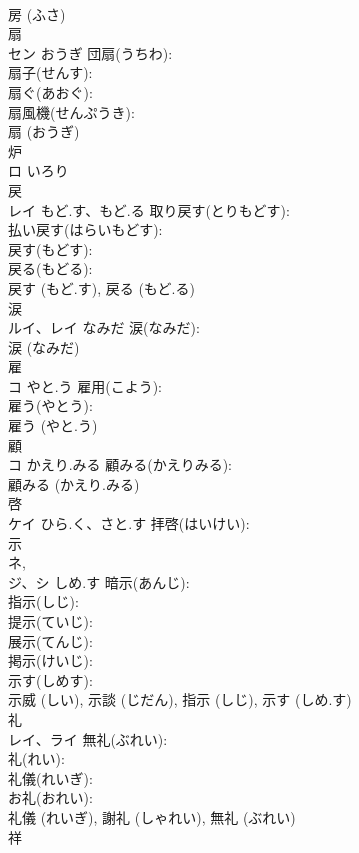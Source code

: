 \documentclass[8pt]{extreport}
\begin{document}
\begin{CJK}{UTF8}{min}
\\	房 (ふさ)
\\	扇			
\\	セン	おうぎ	団扇(うちわ): 
\\	扇子(せんす): 
\\	扇ぐ(あおぐ): 
\\	扇風機(せんぷうき): 
\\	扇 (おうぎ)
\\	炉			
\\	ロ	いろり		
\\	戻			
\\	レイ	もど.す、もど.る	取り戻す(とりもどす): 
\\	払い戻す(はらいもどす): 
\\	戻す(もどす): 
\\	戻る(もどる): 
\\	戻す (もど.す), 戻る (もど.る)
\\	涙			
\\	ルイ、レイ	なみだ	涙(なみだ): 
\\	涙 (なみだ)
\\	雇			
\\	コ	やと.う	雇用(こよう): 
\\	雇う(やとう): 
\\	雇う (やと.う)
\\	顧			
\\	コ	かえり.みる	顧みる(かえりみる): 
\\	顧みる (かえり.みる)
\\	啓			
\\	ケイ	ひら.く、さと.す	拝啓(はいけい): 
\\	示			
\\	ネ, 
\\	ジ、シ	しめ.す	暗示(あんじ): 
\\	指示(しじ): 
\\	提示(ていじ): 
\\	展示(てんじ): 
\\	掲示(けいじ): 
\\	示す(しめす): 
\\	示威 (しい), 示談 (じだん), 指示 (しじ), 示す (しめ.す)
\\	礼			
\\	レイ、ライ		無礼(ぶれい): 
\\	礼(れい): 
\\	礼儀(れいぎ): 
\\	お礼(おれい): 
\\	礼儀 (れいぎ), 謝礼 (しゃれい), 無礼 (ぶれい)
\\	祥			

\end{CJK}
\end{document}
